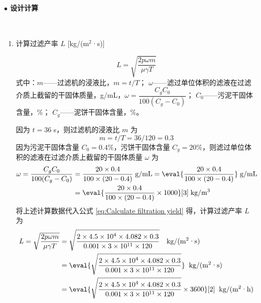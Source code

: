 \paragraph{$\bullet $ 设计计算}~{}\par
\begin{enumerate}
    \item 计算过滤产率 $L$ [kg/(m$^2$·s)]
    
    \begin{equation}\label{eq:Calculate filtration yield}
        L = \sqrt{\dfrac{2p \omega m}{\mu \gamma T}}
    \end{equation}
    式中：$m$——过滤机的浸液比，$m=t/T$；
    \newline\phantom{式中：}$\omega$——滤过单位体积的滤液在过滤介质上截留的干固体质量，g/mL，$\omega = \dfrac{C_g C_0}{100(C_g - C_0)}$；
    \newline\phantom{式中：}$C_0$——污泥干固体含量，\%；
    \newline\phantom{式中：}$C_g$——泥饼干固体含量，\%。

    因为 $t=36$ s，则过滤机的浸液比 $m$ 为
    \begin{equation}
        m=t/T = 36/120 = 0.3
    \end{equation}
    因为污泥干固体含量 $C_0=0.4\%$，污饼干固体含量 $C_g=20\%$，则滤过单位体积的滤液在过滤介质上截留的干固体质量 $\omega$ 为
    \begin{align}
        \omega = \dfrac{C_g C_0}{100(C_g - C_0)} &= \dfrac{20 \times 0.4}{100\times (20-0.4)} \;\text{g/mL} = \eval{\dfrac{20 \times 0.4}{100\times (20-0.4)}} \;\text{g/mL} \\
        &= \eval{\dfrac{20 \times 0.4}{100\times (20-0.4)}\times 1000}[3] \;\text{kg/m$^3$} \notag
    \end{align}
    将上述计算数据代入公式 \ref{eq:Calculate filtration yield} 得，计算过滤产率 $L$ 为
    \begin{align*}
        L = \sqrt{\dfrac{2p \omega m}{\mu \gamma T}} &= \sqrt{\dfrac{2 \times 4.5\times 10^{4} \times 4.082 \times 0.3}{0.001 \times 3\times 10^{11} \times 120}} \quad\text{kg/(m$^2$·s)} \\
        &= \eval{\sqrt{\dfrac{2 \times 4.5\times 10^{4} \times 4.082 \times 0.3}{0.001 \times 3\times 10^{11} \times 120}}} \;\;\text{kg/(m$^2$·s)} \notag \\
        &= \eval{\sqrt{\dfrac{2 \times 4.5\times 10^{4} \times 4.082 \times 0.3}{0.001 \times 3\times 10^{11} \times 120}}\times 3600}[2] \;\;\text{kg/(m$^2$·h)} \notag
    \end{align*}


\end{enumerate}
